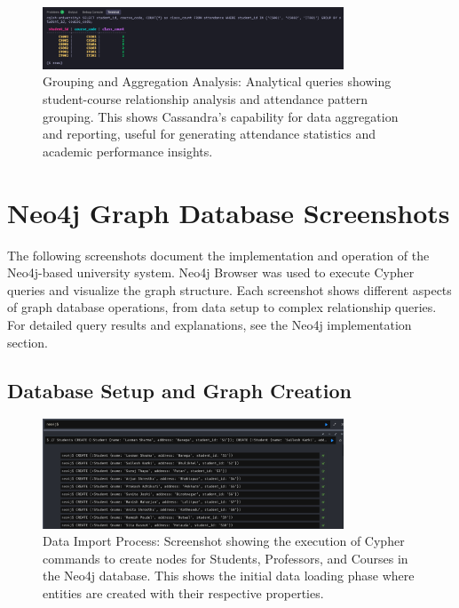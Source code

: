 \begin{figure}[H]
  \centering
  \includegraphics[width=0.8\textwidth]{task-2/screenshots/student-course-group.png}
  \caption{Grouping and Aggregation Analysis: Analytical queries showing student-course relationship analysis and attendance pattern grouping. This shows Cassandra's capability for data aggregation and reporting, useful for generating attendance statistics and academic performance insights.}
  \label{fig:task2-student-course-group}
\end{figure}

\section{Neo4j Graph Database Screenshots}

The following screenshots document the implementation and operation of the Neo4j-based university system. Neo4j Browser was used to execute Cypher queries and visualize the graph structure. Each screenshot shows different aspects of graph database operations, from data setup to complex relationship queries. For detailed query results and explanations, see the Neo4j implementation section.

\subsection*{Database Setup and Graph Creation}

\begin{figure}[H]
  \centering
  \includegraphics[width=0.8\textwidth]{task-3/screenshots/import-data.png}
  \caption{Data Import Process: Screenshot showing the execution of Cypher commands to create nodes for Students, Professors, and Courses in the Neo4j database. This shows the initial data loading phase where entities are created with their respective properties.}
  \label{fig:task3-import-data}
\end{figure}

